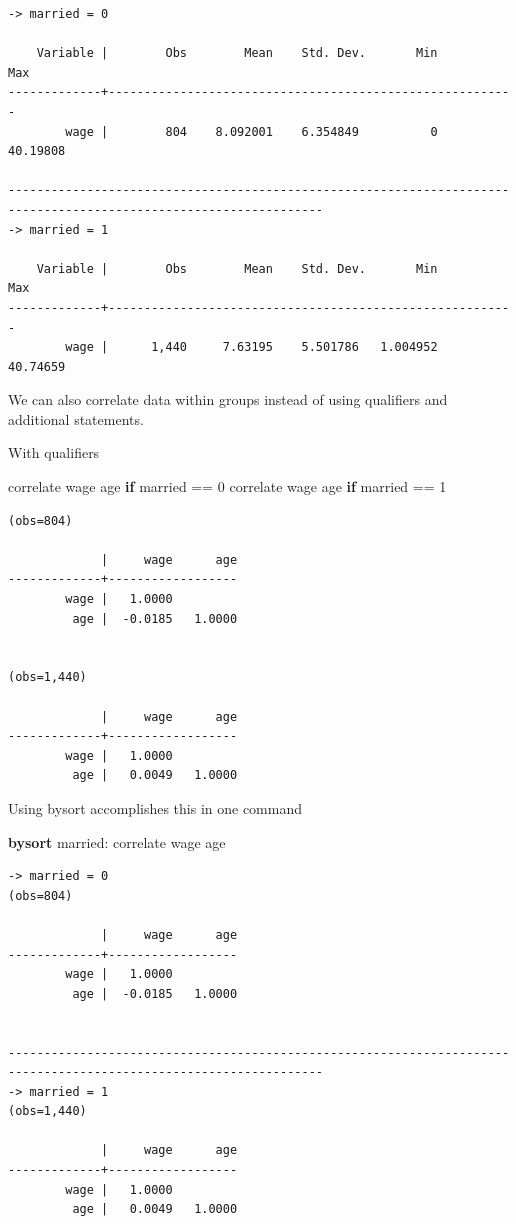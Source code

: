 \documentclass[
]{book}
\newenvironment{Shaded}{\begin{snugshade}}{\end{snugshade}}
\newcommand{\KeywordTok}[1]{\textcolor[rgb]{0.13,0.29,0.53}{\textbf{#1}}}
\newcommand{\NormalTok}[1]{#1}
\begin{document}
\begin{verbatim}
-> married = 0

    Variable |        Obs        Mean    Std. Dev.       Min        Max
-------------+---------------------------------------------------------
        wage |        804    8.092001    6.354849          0   40.19808

------------------------------------------------------------------------------------------------------------------
-> married = 1

    Variable |        Obs        Mean    Std. Dev.       Min        Max
-------------+---------------------------------------------------------
        wage |      1,440     7.63195    5.501786   1.004952   40.74659
\end{verbatim}

We can also correlate data within groups instead of using qualifiers and additional statements.

With qualifiers

\begin{Shaded}
\begin{Highlighting}[]
\NormalTok{correlate wage age }\KeywordTok{if}\NormalTok{ married == 0}
\NormalTok{correlate wage age }\KeywordTok{if}\NormalTok{ married == 1}
\end{Highlighting}
\end{Shaded}

\begin{verbatim}
(obs=804)

             |     wage      age
-------------+------------------
        wage |   1.0000
         age |  -0.0185   1.0000


(obs=1,440)

             |     wage      age
-------------+------------------
        wage |   1.0000
         age |   0.0049   1.0000
\end{verbatim}

Using bysort accomplishes this in one command

\begin{Shaded}
\begin{Highlighting}[]
\KeywordTok{bysort}\NormalTok{ married: correlate wage age}
\end{Highlighting}
\end{Shaded}

\begin{verbatim}
-> married = 0
(obs=804)

             |     wage      age
-------------+------------------
        wage |   1.0000
         age |  -0.0185   1.0000


------------------------------------------------------------------------------------------------------------------
-> married = 1
(obs=1,440)

             |     wage      age
-------------+------------------
        wage |   1.0000
         age |   0.0049   1.0000
\end{verbatim}
\end{document}
